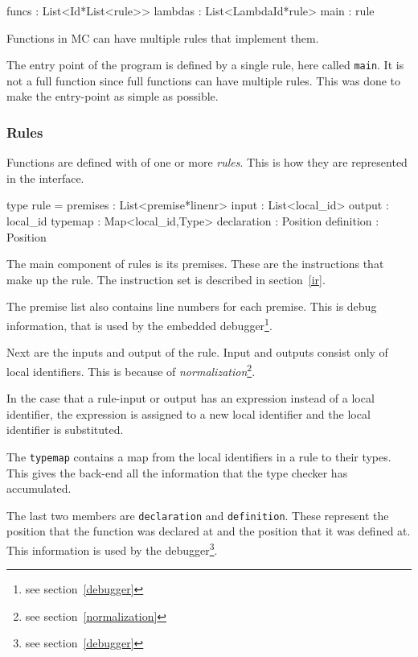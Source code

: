 \begin{FS}
  funcs   : List<Id*List<rule>>
  lambdas : List<LambdaId*rule>
  main    : rule
\end{FS}

Functions in MC can have multiple rules that implement them.

The entry point of the program is defined by a single rule, here called \verb|main|.
It is not a full function since full functions can have multiple rules.
This was done to make the entry-point as simple as possible.

\subsubsection{Rules}

Functions are defined with of one or more \textit{rules}.
This is how they are represented in the interface.

\begin{FS}
type rule = {
  premises    : List<premise*linenr>
  input       : List<local_id>
  output      : local_id
  typemap     : Map<local_id,Type>
  declaration : Position
  definition  : Position
}
\end{FS}

The main component of rules is its premises.
These are the instructions that make up the rule.
The instruction set is described in section~\ref{ir}.

The premise list also contains line numbers for each premise.
This is debug information, that is used by the embedded debugger\footnote{see section~\ref{debugger}}.

Next are the inputs and output of the rule.
Input and outputs consist only of local identifiers.
This is because of \textit{normalization}\footnote{see section~\ref{normalization}}.

In the case that a rule-input or output has an expression instead of a local identifier,
 the expression is assigned to a new local identifier and the local identifier is substituted.

The \texttt{typemap} contains a map from the local identifiers in a rule to their types.
This gives the back-end all the information that the type checker has accumulated.

The last two members are \verb|declaration| and \verb|definition|.
These represent the position that the function was declared at and the position that it was defined at.
This information is used by the debugger\footnote{see section~\ref{debugger}}.

